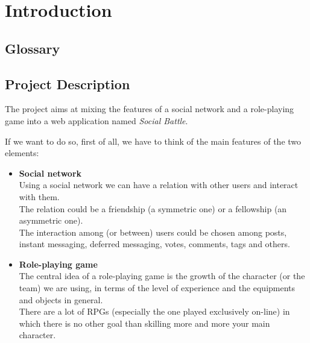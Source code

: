 \chapter{Introduction}
	\section{Glossary}
	\section{Project Description}
		The project aims at mixing the features of a social network and a role-playing game 
		into a web application named \textit{Social Battle}.

		\noindent If we want to do so, first of all, we have to think of the main features of the two elements:
		\begin{itemize}
			\item \textbf{Social network}\\
			Using a social network we can have a relation with other users and interact with them.\\
			The relation could be a friendship (a symmetric one) or a fellowship (an asymmetric one).\\
			The interaction among (or between) users could be chosen among posts, instant messaging, 
			deferred messaging, votes, comments, tags and others.

			\item \textbf{Role-playing game}\\
			The central idea of a role-playing game is the growth of the character (or the team) we 
			are using, in terms of the level of experience and the equipments and objects in general.\\
			There are a lot of RPGs (especially the one played exclusively on-line) in which there is 
			no other goal than skilling more and more your main character.
		\end{itemize}

